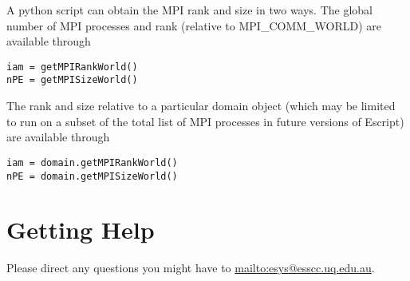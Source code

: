 A python script can obtain the MPI rank and size in two ways.
The global number of MPI processes and rank (relative to MPI_COMM_WORLD) are available through
\begin{verbatim}
iam = getMPIRankWorld()
nPE = getMPISizeWorld()
\end{verbatim}

The rank and size relative to a particular domain object (which may be limited to run on a subset of the
total list of MPI processes in future versions of Escript) are available through
\begin{verbatim}
iam = domain.getMPIRankWorld()
nPE = domain.getMPISizeWorld()
\end{verbatim}

\section{Getting Help}
Please direct any questions you might have to \url{mailto:esys@esscc.uq.edu.au}.
